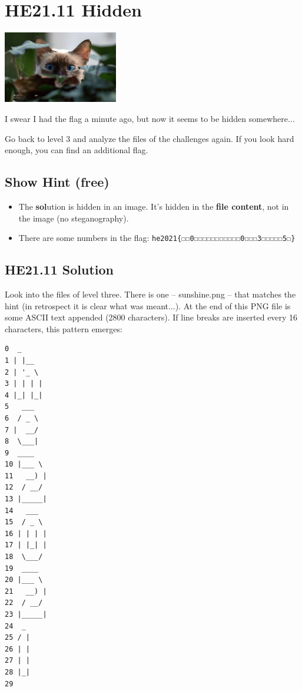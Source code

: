 \documentclass[english,a4paper,nols,noindent]{tufte-handout}
\begin{document}
\hypertarget{he21.11}{%
\section{HE21.11 Hidden}\label{he21.11}}
\begin{marginfigure}
    \includegraphics[width=50mm]{images/challenge11.jpg}
\end{marginfigure}

I swear I had the flag a minute ago, but now it seems to be hidden somewhere...

Go back to level 3 and analyze the files of the challenges again. If
you look hard enough, you can find an additional flag.

\subsection{Show Hint (free)}
\begin{itemize}
\item The \textbf{sol}ution is hidden in an image. It's hidden in the
  \textbf{file content}, not in the image (no steganography).
\item There are some numbers in the flag: \verb+he2021{☐☐0☐☐☐☐☐☐☐☐☐☐☐0☐☐☐3☐☐☐☐☐5☐}+
\end{itemize}

\hypertarget{he21.11-solution}{%
\subsection{HE21.11 Solution}\label{he21.11-solution}}
Look into the files of level three. There is one -- sunshine.png --
that matches the hint (in retrospect it is clear what was meant...).
At the end of this PNG file is some ASCII text appended (2800
characters).  If line breaks are inserted every 16 characters, this
pattern emerges:

\begin{verbatim}
0  _              
1 | |__           
2 | '_ \          
3 | | | |         
4 |_| |_|         
5   ___           
6  / _ \          
7 |  __/          
8  \___|          
9  ____           
10 |___ \          
11   __) |         
12  / __/          
13 |_____|         
14   ___           
15  / _ \          
16 | | | |         
17 | |_| |         
18  \___/          
19  ____           
20 |___ \          
21   __) |         
22  / __/          
23 |_____|         
24  _              
25 / |             
26 | |             
27 | |             
28 |_|             
29
\end{verbatim}
\end{document}
